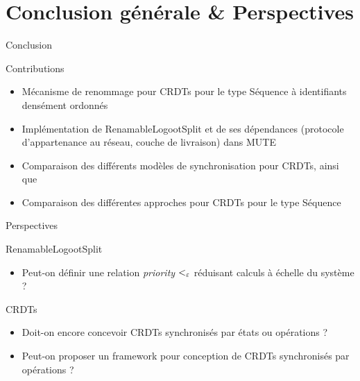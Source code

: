 \section{Conclusion générale \& Perspectives}

\begin{frame}{Conclusion}
  \begin{block}{Contributions}
    \begin{itemize}
      \item Mécanisme de renommage pour CRDTs pour le type Séquence à identifiants densément ordonnés
      \item Implémentation de RenamableLogootSplit et de ses dépendances (protocole d'appartenance au réseau, couche de livraison) dans MUTE
      \item Comparaison des différents modèles de synchronisation pour CRDTs, ainsi que
      \item Comparaison des différentes approches pour CRDTs pour le type Séquence
    \end{itemize}
  \end{block}
\end{frame}

\begin{frame}{Perspectives}
  \begin{block}{RenamableLogootSplit}
    \begin{itemize}
      \item Peut-on définir une relation \emph{priority} $<_{\varepsilon}$ réduisant calculs à échelle du système ?
    \end{itemize}
  \end{block}
  \pause
  \begin{block}{CRDTs}
    \begin{itemize}
      \item Doit-on encore concevoir CRDTs synchronisés par états ou opérations ?
      \item Peut-on proposer un framework pour conception de CRDTs synchronisés par opérations ?
    \end{itemize}
  \end{block}
\end{frame}

